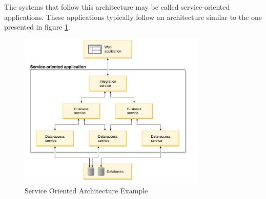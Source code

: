 The systems that follow this architecture may be called service-oriented applications. These applications typically follow an architecture similar to the one presented in figure \ref{fig:soaExample}. 
\par
\begin{figure}[ht]
\centering
\includegraphics[width=0.8\textwidth,keepaspectratio]{chapters/State_of_the_Art/assets/soa_arch.png}
\caption[Service Oriented Architecture Example]{Service Oriented Architecture Example\footnotemark}
\label{fig:soaExample}
\end{figure}


